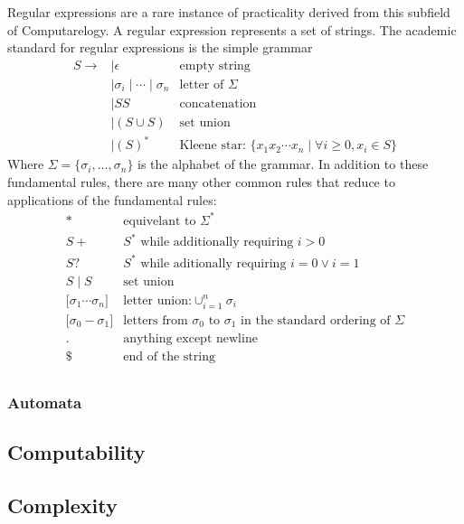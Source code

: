 \documentclass{article}
\begin{document}
	Regular expressions are a rare instance of practicality derived from this subfield of Computarelogy. A regular expression represents a set of strings. The academic standard for regular expressions is the simple grammar
	\[ \begin{array}{rll}
		S \rightarrow
			&\mid \epsilon & \text{empty string} \\
			&\mid \sigma_i \mid \cdots \mid \sigma_n & \text{letter of $\Sigma$} \\
			&\mid SS & \text{concatenation} \\
			&\mid (S \cup S) & \text{set union} \\
			&\mid (S)^* & \text{Kleene star: } \{ x_1 x_2 \cdots x_n \mid \forall i \geq 0, x_i \in S \}
	\end{array} \]
	Where $\Sigma = \{ \sigma_i, \dots, \sigma_n \}$ is the alphabet of the grammar. In addition to these fundamental rules, there are many other common rules that reduce to applications of the fundamental rules:
	\[ \begin{array}{r|l}
		*  			& \text{equivelant to } \Sigma^* \\
		S+ 			& S^* \text{ while additionally requiring } i > 0 \\
		S?			& S^* \text{ while aditionally requiring } i = 0 \lor i = 1 \\
		S \mid S 	& \text{set union} \\
		\text{[} \sigma_1 \cdots \sigma_n \text{]}
					& \text{letter union:} \cup_{i=1}^n \sigma_i \\
		\text{[} \sigma_0-\sigma_1 \text{]}
					& \text{letters from $\sigma_0$ to $\sigma_1$ in the standard ordering of $\Sigma$} \\
		. 			& \text{anything except newline} \\
		\$ 			& \text{end of the string} \\
	\end{array} \]

\subsubsection{Automata}

\subsection{Computability}

\subsection{Complexity}
\end{document}

